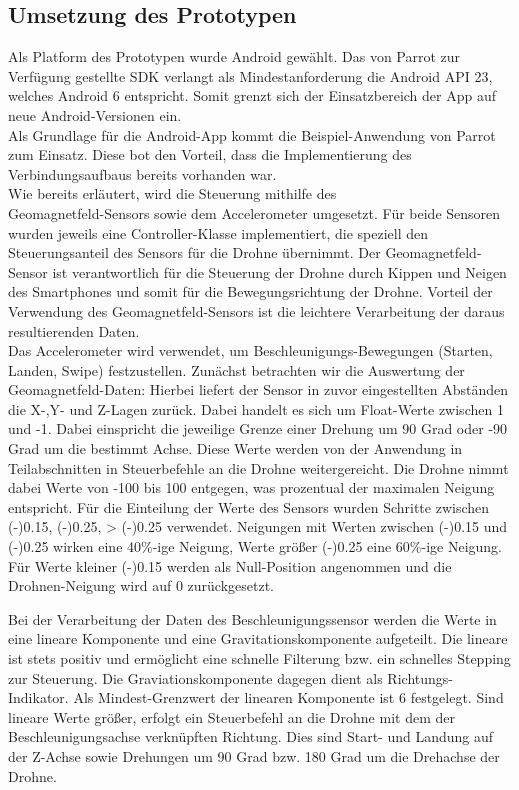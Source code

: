 \documentclass{article}
\begin{document}
\subsection{Umsetzung des Prototypen}
Als Platform des Prototypen wurde Android gewählt. Das von Parrot zur Verfügung gestellte SDK verlangt als Mindestanforderung die Android API 23, welches Android 6 entspricht.
Somit grenzt sich der Einsatzbereich der App auf neue Android-Versionen ein.\\
Als Grundlage für die Android-App kommt die Beispiel-Anwendung von Parrot zum Einsatz. Diese bot den Vorteil, dass die Implementierung des Verbindungsaufbaus bereits vorhanden war.
\\
Wie bereits erläutert, wird die Steuerung mithilfe des \\
Geomagnetfeld-Sensors sowie dem Accelerometer umgesetzt. Für beide Sensoren wurden jeweils eine Controller-Klasse implementiert,
die speziell den Steuerungsanteil des Sensors für die Drohne übernimmt.
Der Geomagnetfeld-Sensor ist verantwortlich für die Steuerung der Drohne durch Kippen und Neigen des Smartphones und somit für die Bewegungsrichtung der Drohne.
Vorteil der Verwendung des Geomagnetfeld-Sensors ist die leichtere Verarbeitung der daraus resultierenden Daten.\\
Das Accelerometer wird verwendet, um Beschleunigungs-Bewegungen (Starten, Landen, Swipe) festzustellen.
Zunächst betrachten wir die Auswertung der Geomagnetfeld-Daten: Hierbei liefert der Sensor in zuvor eingestellten Abständen die X-,Y- und Z-Lagen zurück. Dabei handelt es sich um Float-Werte
zwischen 1 und -1. Dabei einspricht die jeweilige Grenze einer Drehung um 90 Grad oder -90 Grad um die bestimmt Achse. Diese Werte werden von der Anwendung in Teilabschnitten in Steuerbefehle an die
Drohne weitergereicht. Die Drohne nimmt dabei Werte von -100 bis 100 entgegen, was prozentual der maximalen Neigung entspricht. Für die Einteilung der Werte des Sensors wurden Schritte zwischen
(-)0.15, (-)0.25, \textgreater{} (-)0.25 verwendet. Neigungen mit Werten zwischen (-)0.15 und (-)0.25 wirken eine 40\%-ige Neigung, Werte größer (-)0.25 eine 60\%-ige Neigung. Für Werte kleiner
(-)0.15 werden als Null-Position angenommen und die Drohnen-Neigung wird auf 0 zurückgesetzt.

Bei der Verarbeitung der Daten des Beschleunigungssensor werden die Werte in eine lineare Komponente und eine Gravitationskomponente aufgeteilt. Die lineare ist stets positiv und ermöglicht eine schnelle Filterung bzw. ein schnelles Stepping zur Steuerung. Die Graviationskomponente dagegen dient als Richtungs-Indikator.
Als Mindest-Grenzwert der linearen Komponente ist 6 festgelegt. Sind lineare Werte größer, erfolgt ein Steuerbefehl an die Drohne mit dem der Beschleunigungsachse verknüpften Richtung.
Dies sind Start- und Landung auf der Z-Achse sowie Drehungen um 90 Grad bzw. 180 Grad um die Drehachse der Drohne.
\end{document}
